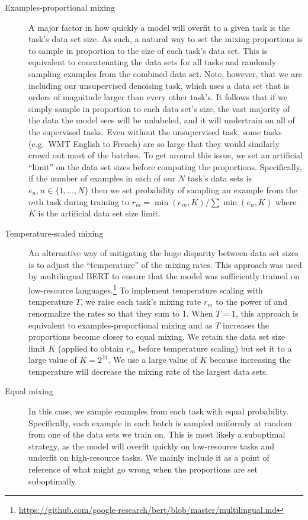 \begin{description}
\item[Examples-proportional mixing] A major factor in how quickly a model will overfit to a given task is the task's data set size. As such, a natural way to set the mixing proportions is to sample in proportion to the size of each task's data set. This is equivalent to concatenating the data sets for all tasks and randomly sampling examples from the combined data set. Note, however, that we are including our unsupervised denoising task, which uses a data set that is orders of magnitude larger than every other task's. It follows that if we simply sample in proportion to each data set's size, the vast majority of the data the model sees will be unlabeled, and it will undertrain on all of the supervised tasks. Even without the unsupervised task, some tasks (e.g.\ WMT English to French) are so large that they would similarly crowd out most of the batches. To get around this issue, we set an artificial ``limit'' on the data set sizes before computing the proportions. Specifically, if the number of examples in each of our $N$ task's data sets is $e_n, n \in \{1, \ldots, N\}$ then we set probability of sampling an example from the $m$th task during training to $r_m = \min(e_m, K)/\sum \min(e_n, K)$ where $K$ is the artificial data set size limit.

\item[Temperature-scaled mixing] An alternative way of mitigating the huge disparity between data set sizes is to adjust the ``temperature'' of the mixing rates. This approach was used by multilingual BERT to ensure that the model was sufficiently trained on low-resource languages.\footnote{\url{https://github.com/google-research/bert/blob/master/multilingual.md}}
To implement temperature scaling with temperature $T$, we raise each task's mixing rate $r_m$ to the power of  and renormalize the rates so that they sum to 1. When $T = 1$, this approach is equivalent to examples-proportional mixing and as $T$ increases the proportions become closer to equal mixing. We retain the data set size limit $K$ (applied to obtain $r_m$ before temperature scaling) but set it to a large value of $K = 2^{21}$. We use a large value of $K$ because increasing the temperature will decrease the mixing rate of the largest data sets.

\item[Equal mixing] In this case, we sample examples from each task with equal probability. Specifically, each example in each batch is sampled uniformly at random from one of the data sets we train on. This is most likely a suboptimal strategy, as the model will overfit quickly on low-resource tasks and underfit on high-resource tasks. We mainly include it as a point of reference of what might go wrong when the proportions are set suboptimally.

\end{description}

